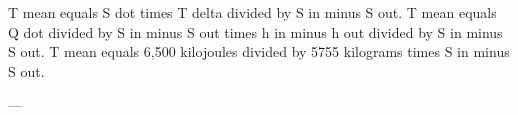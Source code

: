 T mean equals S dot times T delta divided by S in minus S out.  
T mean equals Q dot divided by S in minus S out times h in minus h out divided by S in minus S out.  
T mean equals 6,500 kilojoules divided by 5755 kilograms times S in minus S out.  

---